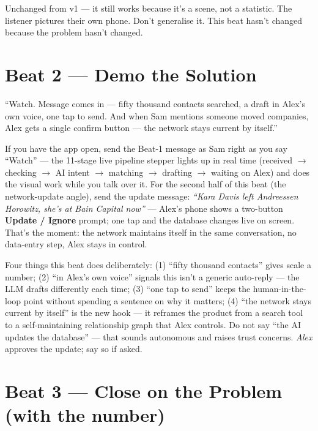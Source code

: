 \documentclass[11pt]{article}
\begin{document}
\begin{notebox}
Unchanged from v1 --- it still works because it's a scene, not a statistic. The listener pictures their own phone. Don't generalise it. This beat hasn't changed because the problem hasn't changed.
\end{notebox}

\section{Beat 2 --- Demo the Solution}

\begin{scriptbox}
``Watch. Message comes in --- fifty thousand contacts searched, a draft in Alex's own voice, one tap to send. And when Sam mentions someone moved companies, Alex gets a single confirm button --- the network stays current by itself.''
\end{scriptbox}

\begin{actionbox}
If you have the app open, send the Beat-1 message as Sam right as you say ``Watch'' --- the 11-stage live pipeline stepper lights up in real time (received $\to$ checking $\to$ AI intent $\to$ matching $\to$ drafting $\to$ waiting on Alex) and does the visual work while you talk over it. For the second half of this beat (the network-update angle), send the update message: \textit{``Kara Davis left Andreessen Horowitz, she's at Bain Capital now''} --- Alex's phone shows a two-button \textbf{Update / Ignore} prompt; one tap and the database changes live on screen. That's the moment: the network maintains itself in the same conversation, no data-entry step, Alex stays in control.
\end{actionbox}

\begin{notebox}
Four things this beat does deliberately: (1) ``fifty thousand contacts'' gives scale a number; (2) ``in Alex's own voice'' signals this isn't a generic auto-reply --- the LLM drafts differently each time; (3) ``one tap to send'' keeps the human-in-the-loop point without spending a sentence on why it matters; (4) ``the network stays current by itself'' is the new hook --- it reframes the product from a search tool to a self-maintaining relationship graph that Alex controls. Do not say ``the AI updates the database'' --- that sounds autonomous and raises trust concerns. \emph{Alex} approves the update; say so if asked.
\end{notebox}

\section{Beat 3 --- Close on the Problem (with the number)}
\end{document}
